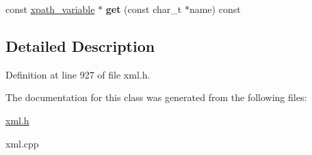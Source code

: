 \begin{DoxyCompactItemize}
\item 
\hypertarget{classphys_1_1xml_1_1xpath__variable__set_a719e167cebc050d4baa11925f3302380}{
const \hyperlink{classphys_1_1xml_1_1xpath__variable}{xpath\_\-variable} $\ast$ {\bfseries get} (const char\_\-t $\ast$name) const }
\label{d8/d65/classphys_1_1xml_1_1xpath__variable__set_a719e167cebc050d4baa11925f3302380}

\end{DoxyCompactItemize}


\subsection{Detailed Description}


Definition at line 927 of file xml.h.



The documentation for this class was generated from the following files:\begin{DoxyCompactItemize}
\item 
\hyperlink{xml_8h}{xml.h}\item 
xml.cpp\end{DoxyCompactItemize}
